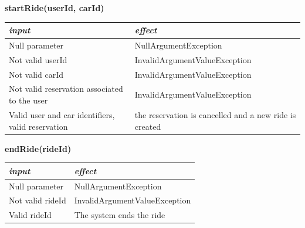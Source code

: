\documentclass{article}
\begin{document}
\begin{flushleft}
   \begin{center}
   \begin{flushleft}
    \textbf{startRide(userId, carId)}
    \end{flushleft}
        \begin{tabular}{  |  p{6cm} | p{6cm} |}
    \hline
    \textit{input} &  \textit{effect} \\
    \hline
    
    Null parameter & NullArgumentException
     \\ 
  \hline
   Not valid userId & InvalidArgumentValueException  \\
  \hline
   Not valid  carId & InvalidArgumentValueException  \\
  \hline
   Not valid  reservation associated to the user & InvalidArgumentValueException  \\
  \hline
  Valid user  and car identifiers, valid reservation &  the reservation is cancelled and a new ride is created   \\
  \hline
    \end{tabular}
\end{center}



   \begin{center}
   \begin{flushleft}
    \textbf{endRide(rideId)}
    \end{flushleft}
        \begin{tabular}{  |  p{6cm} | p{6cm} |}
    \hline
    \textit{input} &  \textit{effect} \\
    \hline
    
    Null parameter & NullArgumentException
     \\ 
  \hline
   Not valid rideId & InvalidArgumentValueException  \\
  \hline
  Valid rideId & The system  ends  the ride  \\
  \hline
    \end{tabular}
\end{center}
      
      
      
      
      
      
      
      
      
      
      
      
      
      
      
      
      
      
      

\end{flushleft}
\end{document}

